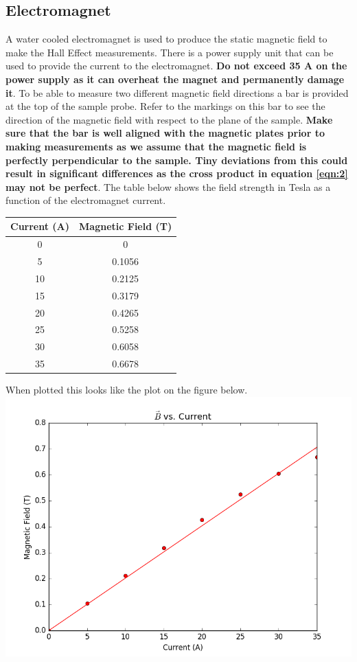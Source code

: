 \documentclass[twocolumn]{article}
\begin{document}
\subsection{Electromagnet}
A water cooled electromagnet is used to produce the static magnetic field to 
make the Hall Effect measurements. There is a power supply unit that can be 
used to provide the current to the electromagnet. \textbf{Do not exceed 35 A 
on the power supply as it can overheat the magnet and permanently damage it}. 
To be able to measure two different magnetic field directions a bar is provided 
at the top of the sample probe. Refer to the markings on this bar to see the 
direction of the magnetic field with respect to the plane of the sample. 
\textbf{Make sure that the bar is well aligned with the magnetic plates prior 
to making measurements as we assume that the magnetic field is perfectly 
perpendicular to the sample. Tiny deviations from this could result in 
significant differences as the cross product in equation \ref{eqn:2} may not 
be perfect}. The table below shows the field strength in Tesla as a function 
of the electromagnet current.
\begin{minipage}{\linewidth}
\Centering
\begin{tabular}{|c|c|}
\hline
Current (A) & Magnetic Field (T) \\\hline
0 & 0 \\ \hline
5 & 0.1056 \\ \hline
10 & 0.2125 \\ \hline
15 & 0.3179 \\ \hline
20 & 0.4265 \\ \hline
25 & 0.5258 \\ \hline
30 & 0.6058 \\ \hline
35 & 0.6678 \\ \hline
\end{tabular}
\label{tbl:2}
\end{minipage}
When plotted this looks like the plot on the figure below.
\center
\includegraphics[width=\linewidth]{magnetic-field-vs-current.png}
\justify
\end{document}
